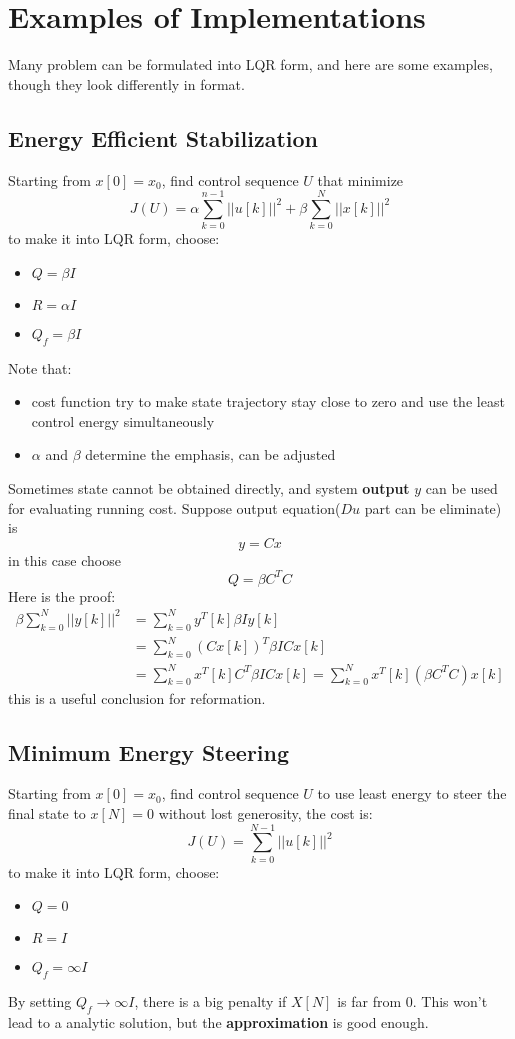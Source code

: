 \documentclass[10pt,a4paper,oneside]{article}
\begin{document}
\section{Examples of Implementations}
Many problem can be formulated into LQR form, and here are some examples, though they look differently in format.

\subsection{Energy Efficient Stabilization}
Starting from $x[0] = x_0$, find control sequence $U$ that minimize
\[
J(U) = \alpha \sum_{k=0}^{n-1} || u[k] ||^2 + \beta \sum_{k=0}^{N} || x[k] ||^2
\]
to make it into LQR form, choose:
\begin{itemize}
	\item $Q = \beta I$
	\item $R = \alpha I$
	\item $Q_f = \beta I$
\end{itemize}
Note that:
\begin{itemize}
	\item cost function try to make state trajectory stay close to zero and use the least control energy simultaneously
	\item $\alpha$ and $\beta$ determine the emphasis, can be adjusted
\end{itemize}
Sometimes state cannot be obtained directly, and system \textbf{output} $y$ can be used for evaluating running cost. Suppose output equation($Du$ part can be eliminate) is
\[
y = Cx
\]
in this case choose 
\[
Q = \beta C^T C
\]
 Here is the proof:
\begin{align*}
\beta \sum_{k=0}^{N} || y[k] ||^2 &=  \sum_{k=0}^{N} y^T [k] \beta I y[k]\\
&= \sum_{k=0}^{N} (Cx[k])^T \beta I Cx[k]\\
&= \sum_{k=0}^{N} x^T[k] C^T \beta I Cx[k] = \sum_{k=0}^{N} x^T[k] (\beta C^T C)x[k]
\end{align*}
this is a useful conclusion for reformation.

\subsection{Minimum Energy Steering}
Starting from $x[0] = x_0$, find control sequence $U$ to use least energy to steer the final state to $x[N] = 0$ without lost generosity, the cost is:
\[
J(U) = \sum_{k=0}^{N-1} ||u[k]||^2
\]
to make it into LQR form, choose:
\begin{itemize}
	\item $Q = 0$
	\item $R =  I$
	\item $Q_f = \infty I$
\end{itemize}
By setting $Q_f \rightarrow \infty I$, there is a big penalty if $X[N]$ is far from $0$. This won't lead to a analytic solution, but the \textbf{approximation} is good enough. 
\end{document}
